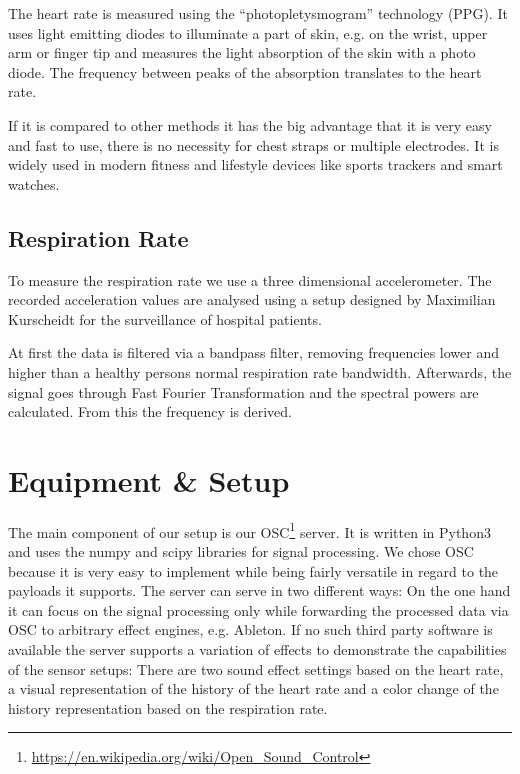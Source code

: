 \documentclass{sigchi-ext}
\begin{document}
The heart rate is measured using the ``photopletysmogram'' technology (PPG).
It uses light emitting diodes to illuminate a part of skin, e.g. on the wrist, upper arm
or finger tip and measures the light absorption of the skin with a photo diode. The frequency
between peaks of the absorption translates to the heart rate. %

If it is compared to other methods it has the big advantage that it is very easy and fast
to use, there is no necessity for chest straps or multiple electrodes. It is widely used
in modern fitness and lifestyle devices like sports trackers and smart watches.

\subsection{Respiration Rate}

To measure the respiration rate we use a three dimensional accelerometer. The recorded
acceleration values are analysed using a setup designed by Maximilian Kurscheidt for
the surveillance of hospital patients\cite{kurscheidt2016open}.

At first the data is filtered via a bandpass filter, removing frequencies lower and higher
than a healthy persons normal respiration rate bandwidth. Afterwards, the signal goes through
Fast Fourier Transformation and the spectral powers are calculated. From this the frequency is
derived. %

\section{Equipment \& Setup}

The main component of our setup is our OSC\footnote{\url{https://en.wikipedia.org/wiki/Open_Sound_Control}}
server. It is written in Python3 and uses the numpy and scipy libraries for signal processing.
We chose OSC because it is very easy to implement while being fairly versatile in regard to
the payloads it supports. The server can serve in two different ways: On the one hand it can
focus on the signal processing only while forwarding the processed data via OSC to arbitrary
effect engines, e.g. Ableton. If no such third party software is available the server supports
a variation of effects to demonstrate the capabilities of the sensor setups: There are two sound
effect settings based on the heart rate, a visual representation of the history of the heart rate
and a color change of the history representation based on the respiration rate. %
\end{document}
